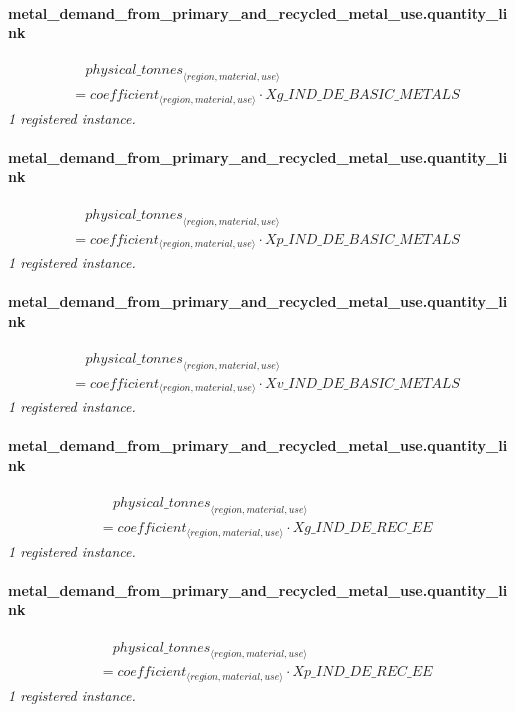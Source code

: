 \documentclass[11pt]{article}
\begin{document}
\paragraph{metal\_demand\_from\_primary\_and\_recycled\_metal\_use.quantity\_link}
\begin{align*}
&\quad {physical\_tonnes}_{\langle region, material, use\rangle}\\
&= coefficient_{\langle region, material, use\rangle} \cdot Xg\_IND\_DE\_BASIC\_METALS
\end{align*}
\noindent\emph{1 registered instance.}\par
\paragraph{metal\_demand\_from\_primary\_and\_recycled\_metal\_use.quantity\_link}
\begin{align*}
&\quad {physical\_tonnes}_{\langle region, material, use\rangle}\\
&= coefficient_{\langle region, material, use\rangle} \cdot Xp\_IND\_DE\_BASIC\_METALS
\end{align*}
\noindent\emph{1 registered instance.}\par
\paragraph{metal\_demand\_from\_primary\_and\_recycled\_metal\_use.quantity\_link}
\begin{align*}
&\quad {physical\_tonnes}_{\langle region, material, use\rangle}\\
&= coefficient_{\langle region, material, use\rangle} \cdot Xv\_IND\_DE\_BASIC\_METALS
\end{align*}
\noindent\emph{1 registered instance.}\par
\paragraph{metal\_demand\_from\_primary\_and\_recycled\_metal\_use.quantity\_link}
\begin{align*}
&\quad {physical\_tonnes}_{\langle region, material, use\rangle}\\
&= coefficient_{\langle region, material, use\rangle} \cdot Xg\_IND\_DE\_REC\_EE
\end{align*}
\noindent\emph{1 registered instance.}\par
\paragraph{metal\_demand\_from\_primary\_and\_recycled\_metal\_use.quantity\_link}
\begin{align*}
&\quad {physical\_tonnes}_{\langle region, material, use\rangle}\\
&= coefficient_{\langle region, material, use\rangle} \cdot Xp\_IND\_DE\_REC\_EE
\end{align*}
\noindent\emph{1 registered instance.}\par
\end{document}
